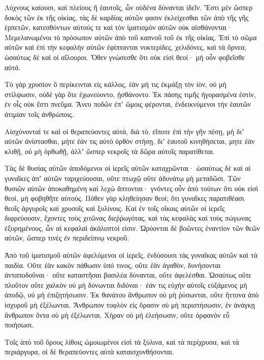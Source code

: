 {\par }{\PP {}Λύχνους καίουσι, καὶ πλείους ἢ ἑαυτοῖς, ὧν οὐδένα δύνανται ἰδεῖν.
Ἔστι μὲν ὥσπερ δοκὸς τῶν ἐκ τῆς οἰκίας, τὰς δὲ καρδίας αὐτῶν φασιν ἐκλείχεσθαι τῶν ἀπὸ τῆς γῆς ἑρπετῶν, κατεσθόντων αὐτούς τε καὶ τὸν ἱματισμὸν αὐτῶν οὐκ αἰσθάνονται·
Μεμελανωμένοι τὸ πρόσωπον αὐτῶν ἀπὸ τοῦ καπνοῦ τοῦ ἐκ τῆς οἰκίας.
Ἐπὶ τὸ σῶμα αὐτῶν καὶ ἐπὶ τὴν κεφαλὴν αὐτῶν ἐφίπτανται νυκτερίδες, χελιδόνες, καὶ τὰ ὄρνεα, ὡσαύτως δὲ καὶ οἱ αἴλουροι.
Ὅθεν γνώσεσθε ὅτι οὐκ εἰσὶ θεοί· μὴ οὖν φοβεῖσθε αὐτά.
\par }{\PP {}Τὸ γὰρ χρυσίον ὃ περίκεινται εἰς κάλλος, ἐὰν μή τις ἐκμάξῃ τὸν ἰὸν, οὐ μὴ στίλψωσιν, οὐδὲ γὰρ ὅτε ἐχωνεύοντο, ᾐσθάνοντο.
Ἐκ πάσης τιμῆς ἠγορασμένα ἐστὶν, ἐν οἷς οὐκ ἔστι πνεῦμα.
Ἄνευ ποδῶν ἐπʼ ὤμοις φέρονται, ἐνδεικνύμενοι τὴν ἑαυτῶν ἀτιμίαν τοῖς ἀνθρώποις.
\par }{\PP {}Αἰσχύνονταί τε καὶ οἱ θεραπεύοντες αὐτὰ, διὰ τὸ, εἴποτε ἐπὶ τὴν γῆν πέσῃ, μὴ διʼ αὐτῶν ἀνίστασθαι, μήτε ἐάν τις αὐτὸ ὀρθὸν στήσῃ, διʼ ἑαυτοῦ κινηθήσεται, μητε ἐὰν κλιθῇ, οὐ μὴ ὀρθωθῇ, ἀλλʼ ὥσπερ νεκροῖς τὰ δῶρα αὐτοῖς παρατίθεται.
\par }{\PP {}Τὰς δὲ θυσίας αὐτῶν ἀποδόμενοι οἱ ἱερεῖς αὐτῶν καταχρῶνται· ὡσαύτως δὲ καὶ αἱ γυναῖκες ἀπʼ αὐτῶν ταριχεύουσαι, οὔτε πτωχῷ οὔτε ἀδυνάτῳ μὴ μεταδῶσι.
Τῶν θυσιῶν αὐτῶν ἀποκαθημένη καὶ λεχὼ ἅπτονται· γνόντες οὖν ἀπὸ τούτων ὅτι οὐκ εἰσὶ θεοὶ, μὴ φοβηθῆτε αὐτούς.
Πόθεν γὰρ κληθείησαν θεοί; ὅτι γυναῖκες παρατιθέασι θεοῖς ἀργυροῖς καὶ χρυσοῖς καὶ ξυλίνοις.
Καὶ ἐν τοῖς οἴκοις αὐτῶν οἱ ἱερεῖς διφρεύουσιν, ἔχοντες τοὺς χιτῶνας διεῤῥωγότας, καὶ τὰς κεφαλὰς καὶ τοὺς πώγωνας ἐξυρημένους, ὧν αἱ κεφαλαὶ ἀκάλυπτοί εἰσιν.
Ὠρύονται δὲ βοῶντες ἐναντίον τῶν θεῶν αὐτῶν, ὥσπερ τινὲς ἐν περιδείπνῳ νεκροῦ.
\par }{\PP {}Ἀπὸ τοῦ ἱματισμοῦ αὐτῶν ἀφελόμενοι οἱ ἱερεῖς, ἐνδύσουσι τὰς γυναῖκας αὐτῶν καὶ τὰ παιδία.
Οὔτε ἐὰν κακὸν πάθωσιν ὑπό τινος, οὔτε ἐὰν ἀγαθὸν, δυνήσονται ἀνταποδοῦναι· οὔτε καταστῆσαι βασιλέα δύνανται, οὔτε ἀφελέσθαι.
Ὡσαύτως οὔτε πλοῦτον οὔτε χαλκὸν οὐ μὴ δύνωνται διδόναι· ἐάν τις εὐχὴν αὐτοῖς εὐξάμενος μὴ ἀποδῷ, οὐ μὴ ἐπιζητήσωσιν.
Ἐκ θανάτου ἄνθρωπον οὐ μὴ ῥύσωνται, οὔτε ἥττονα ἀπὸ ἰσχυροῦ μὴ ἐξέλωνται.
Ἄνθρωπον τυφλὸν εἰς ὅρασιν οὐ μὴ περιστήσωσιν, ἐν ἀνάγκῃ ἄνθρωπον ὄντα οὐ μὴ ἐξέλωνται.
Χήραν οὐ μὴ ἐλεήσωσιν, οὔτε ὀρφανὸν εὖ ποιήσωσι.
\par }{\PP {}Τοῖς ἀπὸ τοῦ ὄρους λίθοις ὡμοιωμένοι εἰσὶ τὰ ξύλινα, καὶ τὰ περίχρυσα, καὶ τὰ περιάργυρα, οἱ δὲ θεραπεύοντες αὐτὰ καταισχυνθήσονται.
}
